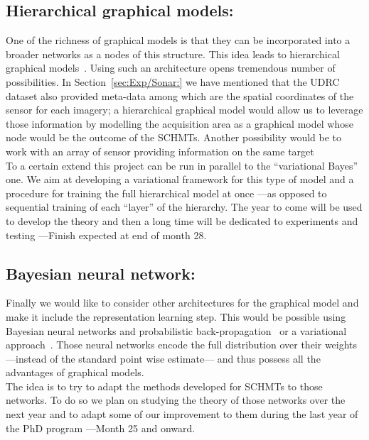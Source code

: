 \documentclass[a4paper,11pt]{report}
\begin{document}
		\subsection{Hierarchical graphical models:}
			\label{subsec:Ccl/FutW/HGM}

			One of the richness of graphical models is that they can be incorporated into a broader networks as a nodes of this structure. This idea leads to hierarchical graphical models~\citep{fine1998hierarchical}. Using such an architecture opens tremendous number of possibilities. In Section~\ref{sec:Exp/Sonar:} we have mentioned that the UDRC dataset also provided meta-data among which are the spatial coordinates of the sensor for each imagery; a hierarchical graphical model would allow us to leverage those information by modelling the acquisition area as a graphical model whose node would be the outcome of the SCHMTs. Another possibility would be to work with an array of sensor providing information on the same target\\
			
			To a certain extend this project can be run in parallel to the ``variational Bayes'' one. We aim at developing a variational framework for this type of model and a procedure for training the full hierarchical model at once ---as opposed to sequential training of each ``layer'' of the hierarchy. The year to come will be used to develop the theory and then a long time will be dedicated to experiments and testing ---Finish expected at end of month 28.     
		
		
		\subsection{Bayesian neural network:}
			\label{subsec:Ccl/FutW/BNN}

			Finally we would like to consider other architectures for the graphical model and make it include the representation learning step. This would be possible using Bayesian neural networks and probabilistic back-propagation~\citep{hernandez2015probabilistic} or a variational approach~\citep{blundell2015weight}. Those neural networks encode the full distribution over their weights ---instead of the standard point wise estimate--- and thus possess all the advantages of graphical models.\\
			
			The idea is to try to adapt the methods developed for SCHMTs to those networks. To do so we plan on studying the theory of those networks over the next year and to adapt some of our improvement to them during the last year of the PhD program ---Month 25 and onward.
\end{document}
